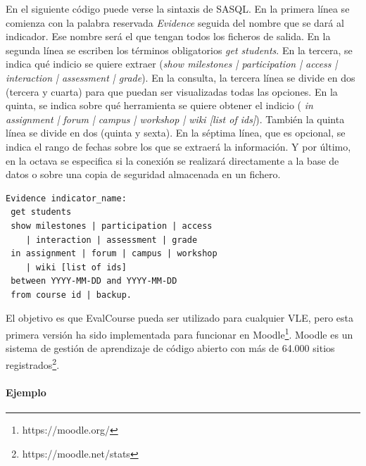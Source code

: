 			En el siguiente código puede verse la sintaxis de SASQL. En la primera línea se comienza con la palabra reservada \emph{Evidence} seguida del nombre que se dará al indicador. Ese nombre será el que tengan todos los ficheros de salida. En la segunda línea se escriben los términos obligatorios \emph{get students}. En la tercera, se indica qué indicio se quiere extraer (\emph{show milestones | participation | access | interaction | assessment | grade}). En la consulta, la tercera línea se divide en dos (tercera y cuarta) para que puedan ser visualizadas todas las opciones. En la quinta, se indica sobre qué herramienta se quiere obtener el indicio (\emph{ in assignment | forum | campus | workshop | wiki [list of ids]}). También la quinta línea se divide en dos (quinta y sexta). En la séptima línea, que es opcional, se indica el rango de fechas sobre los que se extraerá la información. Y por último, en la octava se especifica si la conexión se realizará directamente a la base de datos o sobre una copia de seguridad almacenada en un fichero.



\begin{verbatim}
Evidence indicator_name:
 get students 
 show milestones | participation | access 
	| interaction | assessment | grade
 in assignment | forum | campus | workshop 
	| wiki [list of ids]
 between YYYY-MM-DD and YYYY-MM-DD
 from course id | backup.
\end{verbatim}

			El objetivo es que EvalCourse pueda ser utilizado para cualquier VLE, pero esta primera versión ha sido implementada para funcionar en Moodle\footnote{https://moodle.org/}. Moodle es un sistema de gestión de aprendizaje de código abierto con más de 64.000 sitios registrados\footnote{https://moodle.net/stats}.


			\paragraph{Ejemplo}


